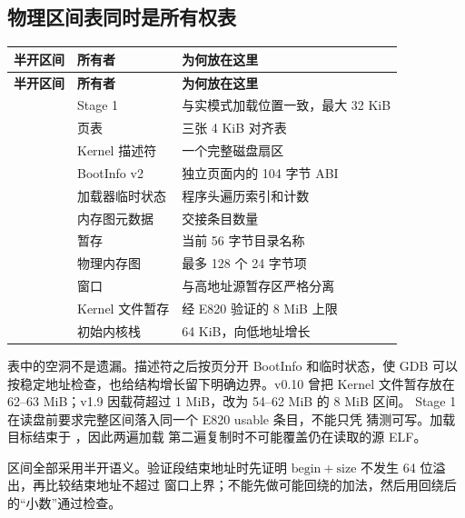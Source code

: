 \subsection{物理区间表同时是所有权表}

\small
\begin{longtable}{L{0.27\textwidth}L{0.27\textwidth}L{0.34\textwidth}}
\toprule
\textbf{半开区间} & \textbf{所有者} & \textbf{为何放在这里}\\
\midrule
\endfirsthead
\toprule
\textbf{半开区间} & \textbf{所有者} & \textbf{为何放在这里}\\
\midrule
\endhead
{} & Stage 1 & 与实模式加载位置一致，最大 32 KiB\\
 & 页表 & 三张 4 KiB 对齐表\\
 & Kernel 描述符 & 一个完整磁盘扇区\\
 & BootInfo v2 & 独立页面内的 104 字节 ABI\\
 & 加载器临时状态 & 程序头遍历索引和计数\\
 & 内存图元数据 & 交接条目数量\\
 &  暂存 & 当前 56 字节目录名称\\
 & 物理内存图 & 最多 128 个 24 字节项\\
 &  窗口 & 与高地址源暂存区严格分离\\
 & Kernel 文件暂存 & 经 E820 验证的 8 MiB 上限\\
 & 初始内核栈 & 64 KiB，向低地址增长\\
\bottomrule
\end{longtable}
\normalsize

表中的空洞不是遗漏。描述符之后按页分开 BootInfo 和临时状态，使 GDB 可以
按稳定地址检查，也给结构增长留下明确边界。v0.10 曾把 Kernel 文件暂存放在
62--63 MiB；v1.9 因载荷超过 1 MiB，改为 54--62 MiB 的 8 MiB 区间。
Stage 1 在读盘前要求完整区间落入同一个 E820 usable 条目，不能只凭
 猜测可写。加载目标结束于 ，因此两遍加载
第二遍复制时不可能覆盖仍在读取的源 ELF。

区间全部采用半开语义。验证段结束地址时先证明
\(\mathrm{begin}+\mathrm{size}\) 不发生 64 位溢出，再比较结束地址不超过
窗口上界；不能先做可能回绕的加法，然后用回绕后的“小数”通过检查。

